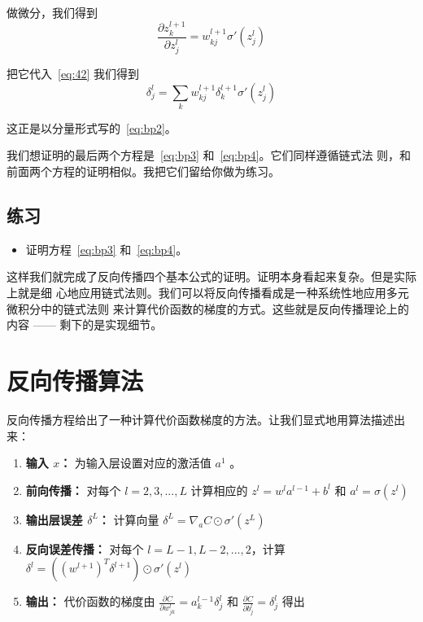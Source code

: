 做微分，我们得到
\begin{equation}
  \frac{\partial z^{l+1}_k}{\partial z^l_j} = w^{l+1}_{kj} \sigma'(z^l_j)
\label{eq:44}\tag{44}
\end{equation}

把它代入~\eqref{eq:42} 我们得到
\begin{equation}
  \delta^l_j = \sum_k w^{l+1}_{kj}  \delta^{l+1}_k \sigma'(z^l_j)
\label{eq:45}\tag{45}
\end{equation}

这正是以分量形式写的~\eqref{eq:bp2}。

我们想证明的最后两个方程是~\eqref{eq:bp3} 和~\eqref{eq:bp4}。它们同样遵循链式法
则，和前面两个方程的证明相似。我把它们留给你做为练习。

\subsection*{练习}

\begin{itemize}
\item 证明方程~\eqref{eq:bp3} 和~\eqref{eq:bp4}。
\end{itemize}

这样我们就完成了反向传播四个基本公式的证明。证明本身看起来复杂。但是实际上就是细
心地应用链式法则。我们可以将反向传播看成是一种系统性地应用多元微积分中的链式法则
来计算代价函数的梯度的方式。这些就是反向传播理论上的内容 —— 剩下的是实现细节。

\section{反向传播算法}
\label{sec:the_backpropagation_algorithm}

反向传播方程给出了一种计算代价函数梯度的方法。让我们显式地用算法描述出来：

\begin{enumerate}
\item \textbf{输入 $x$：} 为输入层设置对应的激活值 $a^{1}$ 。
\item \textbf{前向传播：} 对每个 $l=2,3,...,L$ 计算相应的 $z^l = w^la^{l-1} +
  b^l$ 和 $a^l = \sigma(z^l)$
\item \textbf{输出层误差 $\delta^L$：} 计算向量 $\delta^L = \nabla_a C \odot
  \sigma'(z^L)$
\item \textbf{反向误差传播：} 对每个 $l=L-1, L-2,...,2$，计算
  $\delta^l = ((w^{l+1})^T\delta^{l+1})\odot \sigma'(z^l)$
\item \textbf{输出：} 代价函数的梯度由 $\frac{\partial C}{\partial w^l_{jk}} = a^{l-1}_k \delta^l_j$ 和 $\frac{\partial C}{\partial b_j^l} = \delta_j^l$ 得出
\end{enumerate}

